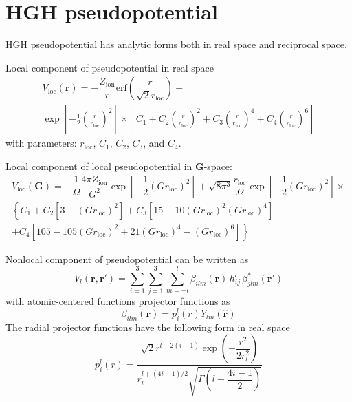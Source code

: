 \section{HGH pseudopotential}

HGH pseudopotential has analytic forms both in real space
and reciprocal space.

Local component of pseudopotential in real space
\begin{multline}
V_{\mathrm{loc}}(\mathbf{r}) = 
-\dfrac{Z_{\mathrm{ion}}}{r}
\mathrm{erf}\left(
\dfrac{r}{\sqrt{2}r_{\mathrm{loc}}}
\right) + \\
\exp
\left[ -\frac{1}{2}
\left( \frac{r}{r_{\mathrm{loc}}}\right)^2
\right]
\times
\left[
C_{1} +
C_{2}\left( \frac{r}{r_{\mathrm{loc}}}\right)^2 +
C_{3}\left( \frac{r}{r_{\mathrm{loc}}}\right)^4 +
C_{4}\left( \frac{r}{r_{\mathrm{loc}}}\right)^6
\right]
\end{multline}
with parameters: $r_{\mathrm{loc}}$, $C_{1}$, $C_{2}$, $C_{3}$, and $C_{4}$.

Local component of local pseudopotential in $\mathbf{G}$-space:
\begin{multline}
V_{\mathrm{loc}}(\mathbf{G}) = 
-\dfrac{1}{\Omega}
\dfrac{4\pi Z_{\mathrm{ion}}}{G^2}
\exp\left[
-\dfrac{1}{2}
\left(Gr_{\mathrm{loc}}\right)^2
\right] + 
\sqrt{8\pi^3}\dfrac{r_{\mathrm{loc}}}{\Omega}
\exp\left[
-\dfrac{1}{2}
\left(Gr_{\mathrm{loc}}\right)^2
\right] \times \\
\left\{
C_{1}
+ C_{2}\left[3-\left(Gr_{\mathrm{loc}}\right)^2\right]
+ C_{3}\left[15 - 10\left(Gr_{\mathrm{loc}}\right)^2
  \left(Gr_{\mathrm{loc}}\right)^4 \right] \right. \\
\left.
+ C_{4}\left[105 - 105\left(Gr_{\mathrm{loc}}\right)^2
  + 21\left(Gr_{\mathrm{loc}}\right)^4
  - \left(Gr_{\mathrm{loc}}\right)^6\right]
\right\}
\end{multline}

Nonlocal component of pseudopotential can be written as
\begin{equation}
V_{l}(\mathbf{r},\mathbf{r}') =
\sum_{i=1}^{3} \sum_{j=1}^{3} \sum_{m=-l}^{l}
\beta_{ilm}(\mathbf{r})\,h^{l}_{ij}\,\beta^{*}_{jlm}(\mathbf{r}')
\end{equation}
with atomic-centered functions projector functions as
\begin{equation}
\beta_{ilm}(\mathbf{r}) = 
p^{l}_{i}(r) Y_{lm}(\hat{\mathbf{r}})
\end{equation}
The radial projector functions have the following form in real space
\begin{equation}
p_{i}^{l}(r) = \frac{\sqrt{2} r^{l+2(i-1)}
\exp\left( -\dfrac{r^2}{2r_{l}^2} \right) }
{r_{l}^{l+(4i-1)/2}
\sqrt{\Gamma\left(l + \dfrac{4i-1}{2}\right)}
}
\end{equation}

